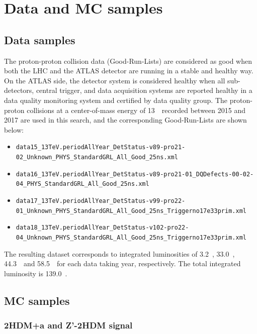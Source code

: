 \chapter{Data and MC samples}
\label{ch:ana-intro}

\section{Data samples}

\par The proton-proton collision data (Good-Run-Lists) are considered as good when both the LHC and the ATLAS detector are running in a stable and healthy way.
On the ATLAS side, the detector system is considered healthy when all sub-detectors, central trigger, and data acquisition systems are reported healthy in a data quality monitoring system and certified by data quality group. 
The proton-proton collisions at a center-of-mass energy of 13~\TeV~recorded between 2015 and 2017 are used in this search, and the corresponding Good-Run-Lists are shown below: 

\begin{itemize}
    \tiny
    \item \texttt{data15\_13TeV.periodAllYear\_DetStatus-v89-pro21-02\_Unknown\_PHYS\_StandardGRL\_All\_Good\_25ns.xml}
    \item \texttt{data16\_13TeV.periodAllYear\_DetStatus-v89-pro21-01\_DQDefects-00-02-04\_PHYS\_StandardGRL\_All\_Good\_25ns.xml}
    \item \texttt{data17\_13TeV.periodAllYear\_DetStatus-v99-pro22-01\_Unknown\_PHYS\_StandardGRL\_All\_Good\_25ns\_Triggerno17e33prim.xml}
    \item \texttt{data18\_13TeV.periodAllYear\_DetStatus-v102-pro22-04\_Unknown\_PHYS\_StandardGRL\_All\_Good\_25ns\_Triggerno17e33prim.xml}
\end{itemize}

\par The resulting dataset corresponds to integrated luminosities of 3.2~\ifb, 33.0~\ifb, 44.3~\ifb\ and 58.5~\ifb\ for each data taking year, respectively. 
The total integrated luminosity is 139.0~\ifb.

\section{MC samples}
\label{ch:data-mc-samples}

\subsection{2HDM+a and Z'-2HDM signal}
\label{subsec:signal}

